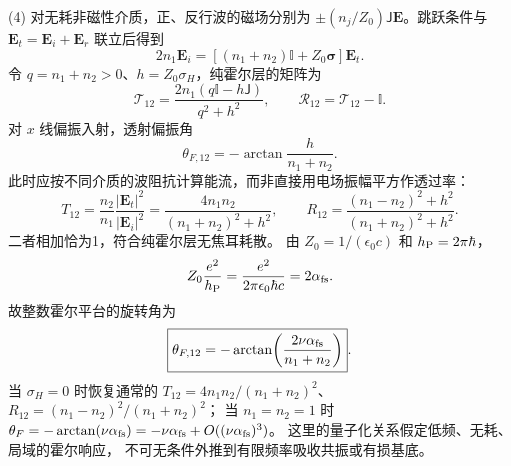 (4) 对无耗非磁性介质，正、反行波的磁场分别为
\(\pm(n_j/Z_0)\mathsf J\mathbf E\)。跳跃条件与
\(\mathbf E_t=\mathbf E_i+\mathbf E_r\) 联立后得到
\[
2n_1\mathbf E_i=[(n_1+n_2)\mathbb I+Z_0\boldsymbol{\sigma}]\mathbf E_t.
\]
令 \(q=n_1+n_2>0\)、\(h=Z_0\sigma_H\)，纯霍尔层的矩阵为
\[
\boxed{\mathcal T_{12}=\frac{2n_1(q\mathbb I-h\mathsf J)}{q^2+h^2}},\qquad
\boxed{\mathcal R_{12}=\mathcal T_{12}-\mathbb I}.
\]
对 \(x\) 线偏振入射，透射偏振角
\[
\boxed{\theta_{F,12}=-\arctan\frac{h}{n_1+n_2}}.
\]
此时应按不同介质的波阻抗计算能流，而非直接用电场振幅平方作透过率：
\[
\boxed{T_{12}=\frac{n_2}{n_1}
\frac{|\mathbf E_t|^2}{|\mathbf E_i|^2}
=\frac{4n_1n_2}{(n_1+n_2)^2+h^2}},\qquad
\boxed{R_{12}=\frac{(n_1-n_2)^2+h^2}{(n_1+n_2)^2+h^2}}.
\]
二者相加恰为1，符合纯霍尔层无焦耳耗散。
由 \(Z_0=1/(\epsilon_0c)\) 和 \(h_{\rm P}=2\pi\hbar\)，
\[
Z_0\frac{e^2}{h_{\rm P}}
=\frac{e^2}{2\pi\epsilon_0\hbar c}=2\alpha_{\rm fs}.
\]
故整数霍尔平台的旋转角为
\[
\boxed{\theta_{F,12}
=-\arctan\!\left(\frac{2\nu\alpha_{\rm fs}}{n_1+n_2}\right)}.
\]
当 \(\sigma_H=0\) 时恢复通常的
\(T_{12}=4n_1n_2/(n_1+n_2)^2\)、
\(R_{12}=(n_1-n_2)^2/(n_1+n_2)^2\)；
当 \(n_1=n_2=1\) 时
\(\theta_F=-\arctan(\nu\alpha_{\rm fs})
=-\nu\alpha_{\rm fs}+O((\nu\alpha_{\rm fs})^3)\)。
这里的量子化关系假定低频、无耗、局域的霍尔响应，
不可无条件外推到有限频率吸收共振或有损基底。